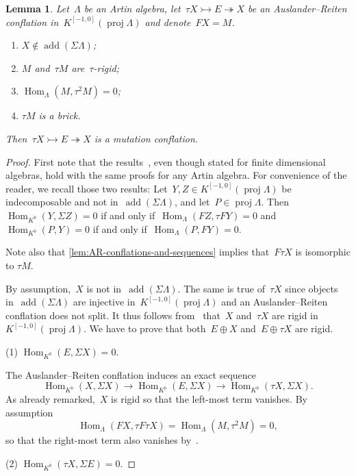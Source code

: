 \documentclass{amsart}
\newtheorem{lemma}[theorem]{Lemma}
\theoremstyle{definition}
\newcommand{\Hom}[1]{\operatorname{Hom}_{#1}}
\newcommand{\susp}{\Sigma}
\newcommand{\add}{\operatorname{add}}
\newcommand{\proj}{\operatorname{proj}}
\newcommand{\infl}{\rightarrowtail}
\newcommand{\defl}{\twoheadrightarrow}
\begin{document}
\begin{lemma}
\label{lem:then-AR-seq-are-mutation}
Let~$\Lambda$ be an Artin algebra, let~$\tau X\infl E\defl X$ be an Auslander--Reiten conflation in~$K^{[-1,0]}(\proj\Lambda)$ and denote~$FX=M$.
\begin{enumerate}
\item $X\notin\add(\susp\Lambda)$;
\item $M$ and~$\tau M$ are~$\tau$-rigid;
\item $\Hom{\Lambda}(M,\tau^2 M)=0$;
\item $\tau M$ is a brick.
\end{enumerate}
Then~$\tau X\infl E\defl X$ is a mutation conflation.
\end{lemma}

\begin{proof}
First note that the results~\cite[Lems.~3.4~\&~3.5]{AdachiIyamaReiten}, even though stated for finite dimensional algebras, hold with the same proofs for any Artin algebra.
For convenience of the reader, we recall those two results: Let~$Y, Z \in K^{[-1,0]}(\proj\Lambda)$ be indecomposable and not in~$\add(\susp\Lambda)$, and let~$P\in\proj\Lambda$. Then~$\Hom{K^b}(Y,\susp Z)=0$ if and only if~$\Hom{\Lambda}(FZ,\tau FY)=0$ and~${\Hom{K^b}(P,Y)=0}$ if and only if~$\Hom{\Lambda}(P,FY)=0$.

Note also that \cref{lem:AR-conflations-and-sequences} implies that~$F\tau X$ is isomorphic to $\tau M$.

By assumption,~$X$ is not in~$\add(\susp\Lambda)$.
The same is true of~$\tau X$ since objects in~$\add(\susp\Lambda)$ are injective in~$K^{[-1,0]}(\proj\Lambda)$ and an Auslander--Reiten conflation does not split.
It thus follows from~\cite[Lem.~3.4 ]{AdachiIyamaReiten} that~$X$ and~$\tau X$ are rigid in $K^{[-1,0]}(\proj\Lambda)$.
We have to prove that both~$E\oplus X$ and~$E\oplus\tau X$ are rigid.

\vspace{7pt}
\noindent (1) $\Hom{K^b}(E,\susp X) = 0$.
\vspace{4pt}

The Auslander--Reiten conflation induces an exact sequence
\[
\Hom{K^b}(X,\susp X) \to \Hom{K^b}(E,\susp X) \to \Hom{K^b}(\tau X,\susp X).
\]
As already remarked,~$X$ is rigid so that the left-most term vanishes.
By assumption
\[
\Hom{\Lambda}(FX,\tau F\tau X) = \Hom{\Lambda}(M,\tau^2 M)=0,
\]
so that the right-most term also vanishes by~\cite[Lem.~3.4 ]{AdachiIyamaReiten}.

\vspace{7pt}
\noindent (2) $\Hom{K^b}(\tau X,\susp E) = 0$.
\vspace{4pt}


\end{proof}
\end{document}
